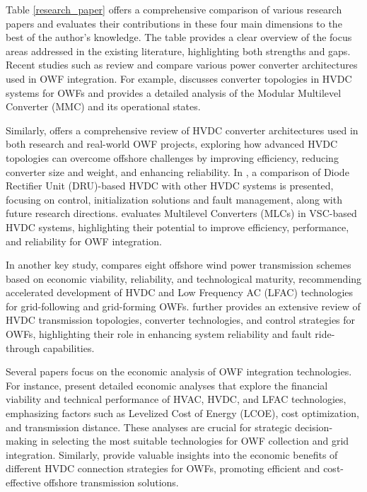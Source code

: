 \documentclass{ieeeaccess}
\begin{document}
Table \ref{research_paper} offers a comprehensive comparison of various research papers and evaluates their contributions in these four main dimensions to the best of the author's knowledge. The table provides a clear overview of the focus areas addressed in the existing literature, highlighting both strengths and gaps. 
Recent studies such as \cite{inamdar2018converters, li2021review, yu2024dru, hk2024review} review and compare various power converter architectures used in OWF integration. For example, \cite{inamdar2018converters} discusses converter topologies in HVDC systems for OWFs and provides a detailed analysis of the Modular Multilevel Converter (MMC) and its operational states. 

Similarly, \cite{li2021review} offers a comprehensive review of HVDC converter architectures used in both research and real-world OWF projects, exploring how advanced HVDC topologies can overcome offshore challenges by improving efficiency, reducing converter size and weight, and enhancing reliability. In \cite{yu2024dru}, a comparison of Diode Rectifier Unit (DRU)-based HVDC with other HVDC systems is presented, focusing on control, initialization solutions and fault management, along with future research directions. \cite{hk2024review} evaluates Multilevel Converters (MLCs) in VSC-based HVDC systems, highlighting their potential to improve efficiency, performance, and reliability for OWF integration.

In another key study, \cite{xu2023eight} compares eight offshore wind power transmission schemes based on economic viability, reliability, and technological maturity, recommending accelerated development of HVDC and Low Frequency AC (LFAC) technologies for grid-following and grid-forming OWFs. \cite{li2020review} further provides an extensive review of HVDC transmission topologies, converter technologies, and control strategies for OWFs, highlighting their role in enhancing system reliability and fault ride-through capabilities.

Several papers focus on the economic analysis of OWF integration technologies. For instance, \cite{hardy2019techno, kucuksari2019impact, fernandez2019offshore, xiang2021comparison} present detailed economic analyses that explore the financial viability and technical performance of HVAC, HVDC, and LFAC technologies, emphasizing factors such as Levelized Cost of Energy (LCOE), cost optimization, and transmission distance. These analyses are crucial for strategic decision-making in selecting the most suitable technologies for OWF collection and grid integration. Similarly, \cite{houghton2016offshore, stamatiou2010techno, bresesti2007hvdc} provide valuable insights into the economic benefits of different HVDC connection strategies for OWFs, promoting efficient and cost-effective offshore transmission solutions.
\end{document}
